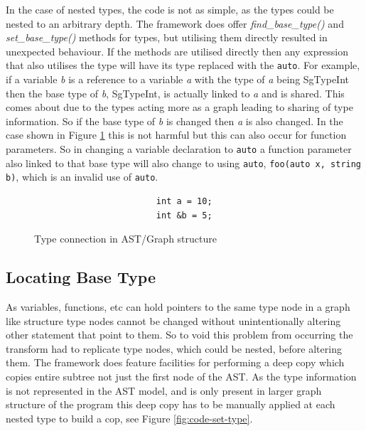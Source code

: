 \documentclass[bsc,frontabs,singlespacing,parskip,deptreport]{infthesis}
\begin{document}
In the case of nested types, the code is not as simple, as the types could be nested to an arbitrary depth. The framework does offer \textit{find\_base\_type()} and \textit{set\_base\_type()} methods for types, but utilising them directly resulted in unexpected behaviour. If the methods are utilised directly then any expression that also utilises the type will have its type replaced with the \texttt{auto}. For example, if a variable \textit{b} is a reference to a variable \textit{a} with the type of \textit{a} being SgTypeInt then the base type of \textit{b}, SgTypeInt, is actually linked to \textit{a} and is shared. This comes about due to the types acting more as a graph leading to sharing of type information. So if the base type of \textit{b} is changed then \textit{a} is also changed. In the case shown in Figure \ref{fig:type-con-bug} this is not harmful but this can also occur for function parameters. So in changing a variable declaration to \texttt{auto} a function parameter also linked to that base type will also change to using \texttt{auto}, \texttt{foo(auto x, string b)}, which is an invalid use of \texttt{auto}.

\begin{figure}[!h]
    \begin{verbatim}
                        int a = 10;
                        int &b = 5;  
    \end{verbatim}
    \caption{Type connection in AST/Graph structure}
    \centering
    \label{fig:type-con-bug}
\end{figure}

\subsection{Locating Base Type}\label{sec:auto-loc-base-type}

As variables, functions, etc can hold pointers to the same type node in a graph like structure type nodes cannot be changed without unintentionally altering other statement that point to them. So to void this problem from occurring the transform had to replicate type nodes, which could be nested, before altering them. The framework does feature facilities for performing a deep copy which copies entire subtree not just the first node of the AST. As the type information is not represented in the AST model, and is only present in larger graph structure of the program this deep copy has to be manually applied at each nested type to build a cop, see Figure \ref{fig:code-set-type}. 
\end{document}
